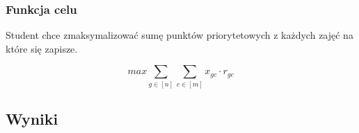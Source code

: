 \documentclass{article}
\theoremstyle{definition}
\theoremstyle{remark}
\theoremstyle{plain}
\theoremstyle{remark}
\theoremstyle{plain}
\begin{document}
\subsubsection{Funkcja celu}
Student chce zmaksymalizować sumę punktów priorytetowych z każdych zajęć na które się zapisze.

\[ max {\sum_{g \in [n]}{\sum_{c \in [m]}{x_{gc}\cdot r_{gc}}}} \]

\subsection{Wyniki}
\end{document}

